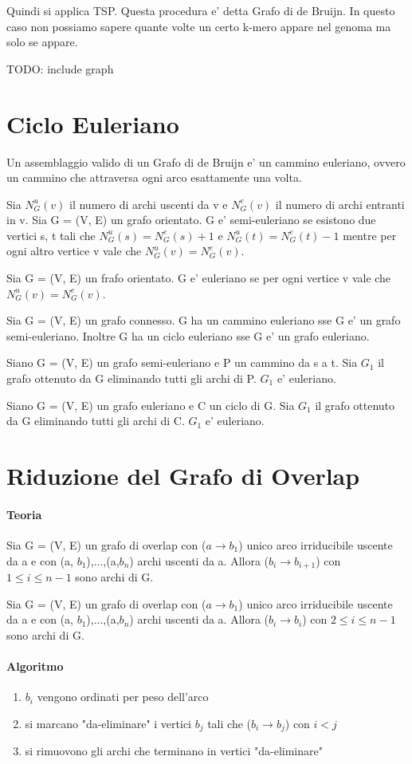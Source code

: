 Quindi si applica TSP. Questa procedura e' detta Grafo di de Bruijn.
In questo caso non possiamo sapere quante volte un certo k-mero appare nel genoma ma solo se appare.

TODO: include graph

\section{Ciclo Euleriano}

Un assemblaggio valido di un Grafo di de Bruijn e' un cammino euleriano, ovvero un cammino che attraversa ogni arco esattamente una volta.

Sia $N^u_G(v)$ il numero di archi uscenti da v e $N^e_G(v)$ il numero di archi entranti in v.
Sia G = (V, E) un grafo orientato. G e' semi-euleriano se esistono due vertici s, t tali che
$N^u_G(s) = N^e_G(s) + 1$ e $N^u_G(t) = N^e_G(t) - 1$ mentre per ogni altro vertice v vale che $N^u_G(v) = N^e_G(v)$.

Sia G = (V, E) un frafo orientato. G e' euleriano se per ogni vertice v vale che $N^u_G(v) = N^e_G(v)$.

Sia G = (V, E) un grafo connesso. G ha un cammino euleriano sse G e' un grafo semi-euleriano.
Inoltre G ha un ciclo euleriano sse G e' un grafo euleriano.

Siano G = (V, E) un grafo semi-euleriano e P un cammino da s a t.
Sia $G_1$ il grafo ottenuto da G eliminando tutti gli archi di P. $G_1$ e' euleriano.

Siano G = (V, E) un grafo euleriano e C un ciclo di G. Sia $G_1$ il grafo ottenuto da G eliminando tutti gli archi di C. $G_1$ e' euleriano.

\section{Riduzione del Grafo di Overlap}

\paragraph{Teoria}

Sia G = (V, E) un grafo di overlap con ($a \rightarrow b_1$) unico arco irriducibile uscente da a e con (a, $b_1$),...,(a,$b_n$) archi uscenti da a. Allora ($b_i \rightarrow b_{i+1}$) con $1 \leq i \leq n-1$ sono archi di G.

Sia G = (V, E) un grafo di overlap con ($a \rightarrow b_1$) unico arco irriducibile uscente da a e con (a, $b_1$),...,(a,$b_n$) archi uscenti da a. Allora ($b_i \rightarrow b_i$) con $2 \leq i \leq n-1$ sono archi di G.

\paragraph{Algoritmo}

\begin{enumerate}
  \item $b_i$ vengono ordinati per peso dell'arco
  \item si marcano "da-eliminare" i vertici $b_j$ tali che ($b_i \rightarrow b_j$) con $i<j$
  \item si rimuovono gli archi che terminano in vertici "da-eliminare"
\end{enumerate}
